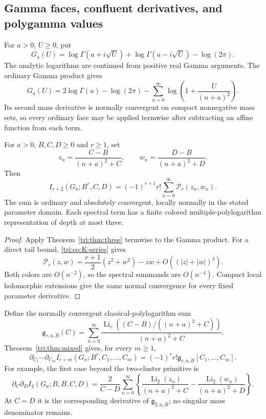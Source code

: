 \subsection{Gamma faces, confluent derivatives, and polygamma values}

For $a>0$, $U\ge0$, put
\[
 G_a(U)=\log\Gamma(a+i\sqrt U)+\log\Gamma(a-i\sqrt U)
                                     -\log(2\pi).
\]
The analytic logarithms are continued from positive real Gamma
arguments. The ordinary Gamma product \cite[\S5.8]{DLMF} gives
\[
 G_a(U)=2\log\Gamma(a)-\log(2\pi)
       -\sum_{n=0}^{\infty}
           \log\left(1+\frac{U}{(n+a)^2}\right).
\]
Its second mass derivative is normally convergent on compact
nonnegative mass sets, so every ordinary face may be applied
termwise after subtracting an affine function from each term.

\begin{corollary}
\label{tri:cor:Gamma}
For $a>0$, $B,C,D\ge0$ and $r\ge1$, set
\[
 z_n=\frac{C-B}{(n+a)^2+C},\qquad
 w_n=\frac{D-B}{(n+a)^2+D}.
\]
Then
\begin{equation}\label{tri:eq:Gamma}
 \boxed{\displaystyle
 I_{r+2}(G_a;B^r,C,D)
   =(-1)^{r+1}r!\sum_{n=0}^{\infty}\mathcal P_r(z_n,w_n).}
\end{equation}
The sum is ordinary and absolutely convergent, locally normally
in the stated parameter domain. Each spectral term has a finite
colored multiple-polylogarithm representation of depth at most
three.
\end{corollary}

\begin{proof}
Apply Theorem~\ref{tri:thm:three} termwise to the Gamma product.
For a direct tail bound, \eqref{tri:eq:K-series} gives
\[
 \mathcal P_r(z,w)=\frac{r+1}{2}(z^2+w^2)-zw
                     +O((|z|+|w|)^3).
\]
Both colors are $O(n^{-2})$, so the spectral summands are
$O(n^{-4})$. Compact local holomorphic extensions give the same
normal convergence for every fixed parameter derivative.
\end{proof}

Define the normally convergent classical-polylogarithm sum
\begin{equation}\label{tri:eq:spectralg}
 \mathfrak g_{r,a,B}(C)=\sum_{n=0}^{\infty}
      \frac{\operatorname{Li}_r((C-B)/((n+a)^2+C))}
           {(n+a)^2+C}.
\end{equation}
Theorem~\ref{tri:thm:mixed} gives, for every $m\ge1$,
\begin{equation}\label{tri:eq:Gamma-mixed}
 \boxed{\displaystyle
 \partial_{C_1}\cdots\partial_{C_m}
 I_{r+m}(G_a;B^r,C_1,\ldots,C_m)
   =(-1)^r r!\mathfrak g_{r,a,B}[C_1,\ldots,C_m].}
\end{equation}
For example, the first case beyond the two-cluster primitive is
\begin{equation}\label{tri:eq:dilog-example}
 \partial_C\partial_D I_4(G_a;B,B,C,D)
   =\frac{2}{C-D}\sum_{n=0}^{\infty}
      \left\{\frac{\operatorname{Li}_2(z_n)}{(n+a)^2+C}
             -\frac{\operatorname{Li}_2(w_n)}{(n+a)^2+D}\right\}.
\end{equation}
At $C=D$ it is the corresponding derivative of
$\mathfrak g_{2,a,B}$; no singular mass denominator remains.

